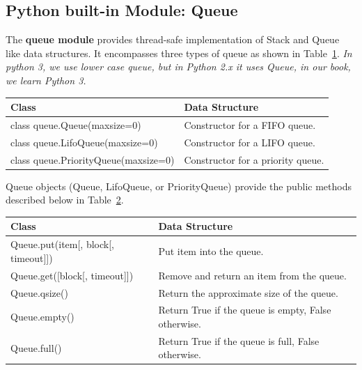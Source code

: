 \documentclass[../main.tex]{subfiles}
\begin{document}
\subsection{Python built-in Module: Queue}
The \textbf{queue module} provides thread-safe implementation of Stack and Queue like data structures. It encompasses three types of queue as shown in Table~\ref{tab:three_classes_queue}. \textit{In python 3, we use lower case queue, but in Python 2.x it uses Queue, in our book, we learn Python 3.}
\begin{table}[h]
\begin{small}
\centering
\noindent{}
 \noindent \begin{tabular}{|p{}|p{}| }
  \hline
Class & Data Structure \\ \hline
class queue.Queue(maxsize=0)  & Constructor for a FIFO queue.  \\\hline
class queue.LifoQueue(maxsize=0)  & Constructor for a LIFO queue. \\ \hline
class queue.PriorityQueue(maxsize=0) & Constructor for a priority queue.\\ \hline
\end{tabular}
  \label{tab:three_classes_queue}
  \end{small}
\end{table}

Queue objects (Queue, LifoQueue, or PriorityQueue) provide the public methods described below in Table~\ref{tab:methods_of_queue}.
\begin{table}[h]
\begin{small}
\centering
\noindent{}
 \noindent \begin{tabular}{|p{}|p{}| }
  \hline
Class & Data Structure \\ \hline
Queue.put(item[, block[, timeout]]) & Put item into the queue.   \\\hline
Queue.get([block[, timeout]])  & Remove and return an item from the queue.  \\ \hline
Queue.qsize() & Return the approximate size of the queue.\\ \hline
Queue.empty() & Return True if the queue is empty, False otherwise.\\ \hline
Queue.full() & Return True if the queue is full, False otherwise. \\ \hline
\end{tabular}
  \label{tab:methods_of_queue}
  \end{small}
\end{table}
\end{document}
